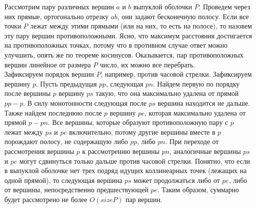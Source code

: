 Рассмотрим пару различных вершин $a$ и $b$ выпуклой оболочки $P$. Проведем
через них прямые, ортогонально отрезку $ab$, они задают бесконечную
полосу. Если все точки $P$ лежат
между этими прямыми (или на них, то есть на полосе),
то назовем эту пару вершин противоположными.
Ясно, что максимум расстояния достигается на противоположных точках,
потому что в противном случае ответ можно улучшить, опять же
по теореме косинусов.
Оказывается, пар противоположных вершин линейное от размера $P$ число,
их можно все перебрать.\\
Зафиксируем порядок вершин $P$, например, против часовой стрелки. Зафиксируем
вершину $p$. Пусть предыдущая $pp$, следующая $pn$. Найдем первую
по порядку после вершины $p$ вершину $ps$ такую, что она максимально
удалена от прямой $pp-p$. В силу монотонности следующая после $ps$ вершина
находится не дальше. Также найдем последнюю после $p$ вершину $pe$,
которая максимально удалена от прямой $p-pn$. Все вершины, которые образуют
противоположную пару с $p$ лежат между $ps$ и $pe$ включительно,
потому другие вершины вместе в $p$ порождают полосу, не содержащую
либо $pp$, либо $pn$. При переходе от рассмотрения вершины $p$ к рассмотрению
вершины $pn$, аналогичные вершины $ps$ и $pe$ могут сдвинуться
только дальше против часовой стрелки. Понятно, что если в выпуклой
оболочке нет трех подряд идущих коллинеарных точек (лежащих на одной прямой),
то следующая вершина $ps$ может продолжаться либо от $pe$, либо от вершины,
непосредственно предшествующей $pe$. Таким образом, суммарно
будет рассмотрено не более $O(size P)$ пар вершин.\\
